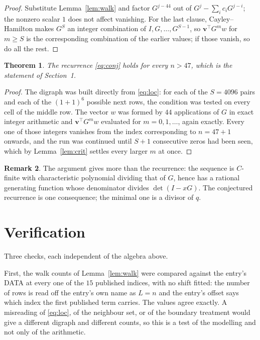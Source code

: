 \documentclass[11pt,a4paper]{article}
\theoremstyle{plain}
\newtheorem{theorem}{Theorem}
\theoremstyle{definition}
\newtheorem{remark}[theorem]{Remark}
\begin{document}
\begin{proof}
Substitute Lemma~\ref{lem:walk} and factor $G^{j-44}$ out of
$G^{j}-\sum_ic_iG^{j-i}$; the nonzero scalar $1$ does not affect
vanishing. For the last clause, Cayley--Hamilton makes $G^{S}$ an integer combination of
$I,G,\dots,G^{S-1}$, so $\mathbf{v}^{\!\top}G^{m}w$ for $m\ge S$ is the corresponding
combination of the earlier values; if those vanish, so do all the rest.
\end{proof}

\begin{theorem}
The recurrence \eqref{eq:conj} holds for every $n>47$, which is the statement of
Section~1.
\end{theorem}

\begin{proof}
The digraph was built directly from \eqref{eq:loc}: for each of the $S=4096$ pairs and each
of the $(1+1)^{6}$ possible next rows, the condition was tested on every cell of
the middle row. The vector $w$ was formed by $44$ applications of $G$ in exact integer
arithmetic and $\mathbf{v}^{\!\top}G^{m}w$ evaluated for $m=0,1,\dots$, again exactly.
Every one of those integers vanishes from the index corresponding to $n=47+1$ onwards,
and the run was continued until $S+1$ consecutive zeros had been seen, which by
Lemma~\ref{lem:crit} settles every larger $m$ at once.
\end{proof}

\begin{remark}
The argument gives more than the recurrence: the sequence is $C$-finite with characteristic
polynomial dividing that of $G$, hence has a rational generating function whose denominator
divides $\det(I-xG)$. The conjectured recurrence is one consequence; the minimal one is a
divisor of $q$.
\end{remark}

\section{Verification}

Three checks, each independent of the algebra above.

First, the walk counts of Lemma~\ref{lem:walk} were compared against the entry's DATA at
every one of the $15$ published indices, with no shift fitted: the number of rows is
read off the entry's own name as $L=n$ and the entry's offset says which index the first
published term carries. The values agree exactly. A misreading of \eqref{eq:loc}, of the
neighbour set, or of the boundary treatment would give a different digraph and different
counts, so this is a test of the modelling and not only of the arithmetic.
\end{document}
